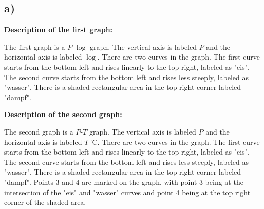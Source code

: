 

\subsection*{a)}

\textbf{Description of the first graph:}

The first graph is a $P$-$\log$ graph. The vertical axis is labeled $P$ and the horizontal axis is labeled $\log$. There are two curves in the graph. The first curve starts from the bottom left and rises linearly to the top right, labeled as "eis". The second curve starts from the bottom left and rises less steeply, labeled as "wasser". There is a shaded rectangular area in the top right corner labeled "dampf".

\textbf{Description of the second graph:}

The second graph is a $P$-$T$ graph. The vertical axis is labeled $P$ and the horizontal axis is labeled $T \, ^\circ \text{C}$. There are two curves in the graph. The first curve starts from the bottom left and rises linearly to the top right, labeled as "eis". The second curve starts from the bottom left and rises less steeply, labeled as "wasser". There is a shaded rectangular area in the top right corner labeled "dampf". Points 3 and 4 are marked on the graph, with point 3 being at the intersection of the "eis" and "wasser" curves and point 4 being at the top right corner of the shaded area.